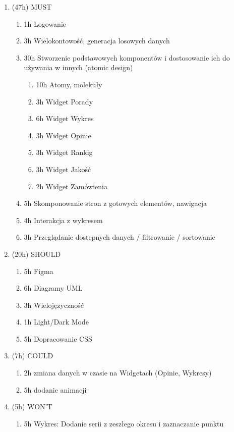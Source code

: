 \documentclass[a4paper,11pt]{article}
\begin{document}
\begin{enumerate}
    \item (47h) MUST
    \begin{enumerate}
        \item 1h Logowanie
        \item 3h Wielokontowość, generacja losowych danych
        \item 30h Stworzenie podstawowych komponentów i dostosowanie ich do używania w innych (atomic design) 
        \begin{enumerate}
            \item 10h Atomy, molekuły
            \item 3h Widget Porady
            \item 6h Widget Wykres
            \item 3h Widget Opinie
            \item 3h Widget Rankig
            \item 3h Widget Jakość
            \item 2h Widget Zamówienia
        \end{enumerate}
        \item 5h Skomponowanie stron z gotowych elementów, nawigacja
        \item 4h Interakcja z wykresem
        \item 3h Przeglądanie dostępnych danych / filtrowanie / sortowanie
    \end{enumerate}
    \item (20h) SHOULD
    \begin{enumerate}
        \item 5h Figma
        \item 6h Diagramy UML
        \item 3h Wielojęzyczność
        \item 1h Light/Dark Mode
        \item 5h Dopracowanie CSS
    \end{enumerate}
    \item (7h) COULD
    \begin{enumerate}
        \item 2h zmiana danych w czasie na Widgetach (Opinie, Wykresy)
        \item 5h dodanie animacji
    \end{enumerate}
    \item (5h) WON'T
    \begin{enumerate}
        \item 5h Wykres: Dodanie serii z zeszłego okresu i zaznaczanie punktu
        
    \end{enumerate}
\end{enumerate}
\end{document}
